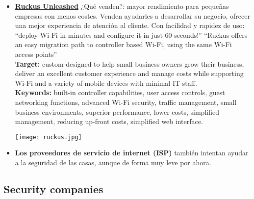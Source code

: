 \begin{itemize}
	\item \href{https://www.ruckuswireless.com/products/system-management-control/unleashed}{\textbf{Ruckus Unleashed}} ¿Qué venden?: mayor rendimiento para pequeñas empresas con menos costes. Venden ayudarles a desarrollar su negocio, ofrecer una mejor experiencia de atención al cliente. Con facilidad y rapidez de uso: ``deploy Wi-Fi in minutes and configure it in just 60 seconds!'' ``Ruckus offers an easy migration path to controller based Wi-Fi, using the same Wi-Fi access points''\\
	\textbf{Target:} custom-designed to help small business owners grow their business, deliver an excellent customer experience and manage costs while supporting Wi-Fi and a variety of mobile devices with minimal IT staff.\\
	\textbf{Keywords:} built-in controller capabilities, user access controls, guest networking functions, advanced Wi-Fi security, traffic management, small business environments, superior performance, lower costs, simplified management, reducing up-front costs, simplified web interface.\\
	\begin{center}
		\texttt{[image: ruckus.jpg]}
	\end{center}
	
	\item \textbf{Los proveedores de servicio de internet (ISP)} también intentan ayudar a la seguridad de las casas, aunque de forma muy leve por ahora.
\end{itemize}

\subsection{Security companies} 

